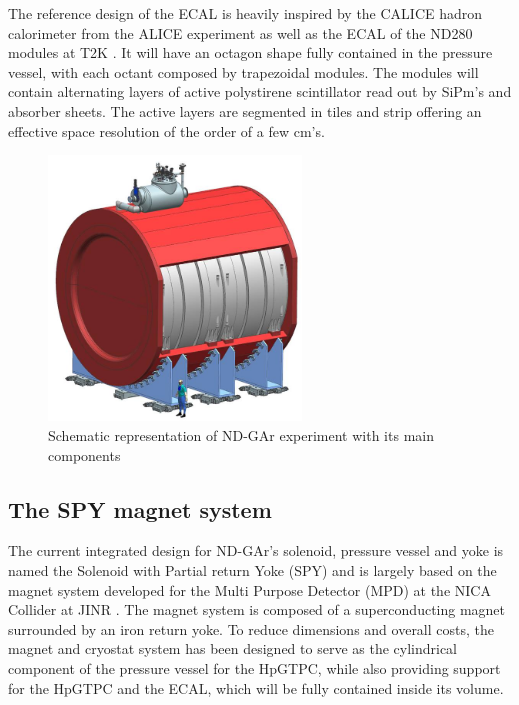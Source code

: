 The reference design of the ECAL is heavily inspired by the CALICE hadron calorimeter from the ALICE experiment \cite{CALICE:2010fpb} as well as the ECAL of the ND280 modules at T2K \cite{T2KUK:2013wkh}. It will have an octagon shape fully contained in the pressure vessel, with each octant composed by trapezoidal modules. The modules will contain alternating layers of active polystirene scintillator read out by SiPm's and absorber sheets. The active layers are segmented in tiles and strip offering an effective space resolution of the order of a few cm's.

\begin{figure}[t]
     \centering
     \includegraphics[width=0.6\textwidth]{figures/ch3-DUNE/Spy.jpg}
     \caption{Schematic representation of ND-GAr experiment with its main components}
        \label{fig:Spy}
\end{figure}

\subsection{The SPY magnet system}
The current integrated design for ND-GAr's solenoid, pressure vessel and yoke is named the Solenoid with Partial return Yoke (SPY) \cite{Bersani:2023rlw} and is largely based on the magnet system developed for the Multi Purpose Detector (MPD) at the NICA Collider at JINR \cite{Golovatyuk:2016zps}. The magnet system is composed of a superconducting magnet surrounded by an iron return yoke. To reduce dimensions and overall costs, the magnet and cryostat system has been designed to serve as the cylindrical component of the pressure vessel for the HpGTPC, while also providing support for the HpGTPC and the ECAL, which will be fully contained inside its volume.

